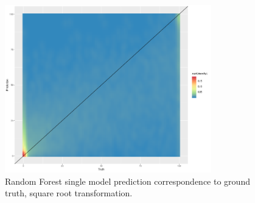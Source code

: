 \documentclass[a4paper,10pt]{article}
\begin{document}
\begin{figure}
    \includegraphics[width=0.8\textwidth]{article-figures/binplots/2019-04-12-rf-1m-uncor-raster-n50sqrt}
    \caption{Random Forest single model prediction correspondence to ground truth, square root transformation.}
    \label{bin-rf-1m-uncor-rastersqrt}
\end{figure}
\end{document}
